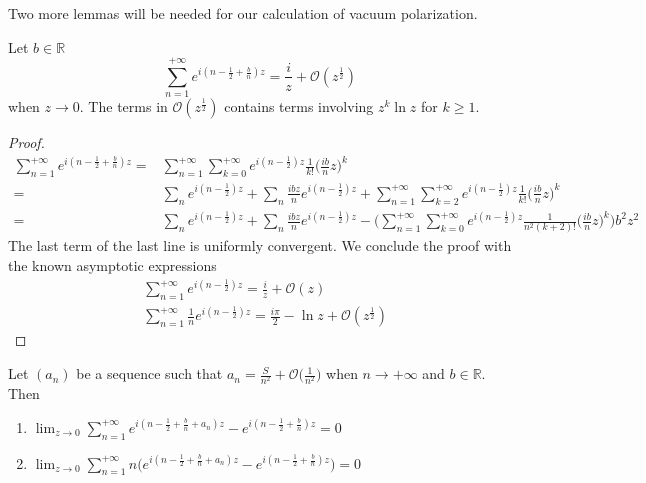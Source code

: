 Two more lemmas will be needed for our calculation of vacuum polarization.
\begin{lemma}
Let $b\in\mathbb{R}$
\begin{equation*}
\sum_{n=1}^{+\infty} e^{i(n - \frac 1 2+\frac b n)z} = \frac i z  + \mathcal{O}(z^{\frac 1 2})
\end{equation*}
when $z\rightarrow 0 $. 
The terms in $\mathcal{O}(z^{\frac 1 2})$ contains terms involving $z^k \ln z$ for $k\geq 1$.
\end{lemma}
\begin{proof}
\begin{equation*}
\begin{split}
\sum_{n=1}^{+\infty} e^{i(n - \frac 1 2 +\frac b n)z} = & 
\sum_{n=1}^{+\infty} \sum_{k=0}^{+\infty} e^{i(n - \frac 1 2)z} \frac{1}{k!}\big(\frac{ib}{n}z\big)^k \\
%
= & \sum_n e^{i(n-\frac 1 2 )z} + \sum_n \frac{ibz}{n}e^{i(n-\frac 1 2 )z} + \sum_{n=1}^{+\infty} \sum_{k=2}^{+\infty} e^{i(n-\frac 1 2)z} \frac{1}{k!}\big(\frac{ib}{n}z\big)^k  \\
%
= & \sum_n e^{i(n-\frac 1 2)z} + \sum_n \frac{ibz}{n}e^{i(n-\frac 1 2)z} - 
\bigg(\sum_{n=1}^{+\infty} \sum_{k=0}^{+\infty} 
e^{i(n-\frac 1 2)z} \frac{1}{n^2(k+2)!}\big(\frac{ib}{n}z\big)^k 
\bigg)b^2z^2
\end{split}
\end{equation*}
The last term of the last line is uniformly convergent.
We conclude the proof with the known asymptotic expressions
\begin{equation}\label{wen-lem1n}
\begin{split}
& \sum_{n=1}^{+\infty}e^{i(n - \frac 1 2 )z} = 
\frac i z  + \mathcal{O}(z) \\
%
& \sum_{n=1}^{+\infty}\frac 1 n e^{i(n-\frac 1 2)z} =
\frac{i\pi}{2} - \ln z + \mathcal{O}(z^\frac{1}{2})
\end{split}
\end{equation}
\end{proof}
%
\begin{lemma}\label{wen-lemmacvu}
Let $(a_n)$ be a sequence such that $a_n = \frac{S}{n^2}+\mathcal{O}\big(\frac{1}{n^2})$ when $n\rightarrow+\infty$ and $b\in\mathbb{R}$. Then
\begin{enumerate}[font=\normalfont]
\item 
$
\lim_{z\rightarrow 0}\sum_{n=1}^{+\infty} e^{i(n-\frac 1 2+\frac{b}{n}+a_n)z } - e^{i(n-\frac 1 2+\frac{b}{n})z }=0
$
\item 
$
\lim_{z\rightarrow 0}\sum_{n=1}^{+\infty}n\big( e^{i(n-\frac 1 2+\frac{b}{n}+a_n)z } - e^{i(n-\frac 1 2+\frac{b}{n})z }\big)=0
$
\end{enumerate}
\end{lemma}
